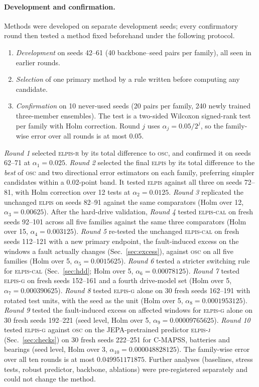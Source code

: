 \documentclass{esannV2}
\newcommand{\OSC}{\textsc{osc}}
\newcommand{\RPT}{\textsc{elpis}}
\newcommand{\Rone}{\textsc{elpis-r}}
\newcommand{\AUTO}{\textsc{elpis-cal}}
\newcommand{\AUTOD}{\textsc{elpis-g}}
\newcommand{\EJ}{\textsc{elpis-j}}
\begin{document}
\paragraph{Development and confirmation.} Methods were developed on separate development seeds; every confirmatory round then tested a method fixed beforehand under the following protocol.
\begin{enumerate}
\item \emph{Development} on seeds 42--61 (40 backbone--seed pairs per family), all seen in earlier rounds.
\item \emph{Selection} of one primary method by a rule written before computing any candidate.
\item \emph{Confirmation} on 10 never-used seeds (20 pairs per family, 240 newly trained three-member ensembles). The test is a two-sided Wilcoxon signed-rank test per family with Holm correction. Round $j$ uses $\alpha_j=0.05/2^j$, so the family-wise error over all rounds is at most 0.05.
\end{enumerate}
\emph{Round 1} selected \Rone{} by its total difference to \OSC, and confirmed it on seeds 62--71 at $\alpha_1=0.025$. \emph{Round 2} selected the final \RPT{} by its total difference to the \emph{best} of \OSC{} and two directional error estimators on each family, preferring simpler candidates within a 0.02-point band. It tested \RPT{} against all three on seeds 72--81, with Holm correction over 12 tests at $\alpha_2=0.0125$. \emph{Round 3} replicated the unchanged \RPT{} on seeds 82--91 against the same comparators (Holm over 12, $\alpha_3=0.00625$). After the hard-drive validation, \emph{Round 4} tested \AUTO{} on fresh seeds 92--101 across all five families against the same three comparators (Holm over 15, $\alpha_4=0.003125$). \emph{Round 5} re-tested the unchanged \AUTO{} on fresh seeds 112--121 with a new primary endpoint, the fault-induced excess on the windows a fault actually changes (Sec.~\ref{sec:excess}), against \OSC{} on all five families (Holm over 5, $\alpha_5=0.0015625$). \emph{Round 6} tested a stricter switching rule for \AUTO{} (Sec.~\ref{sec:hdd}; Holm over 5, $\alpha_6=0.00078125$). \emph{Round 7} tested \AUTOD{} on fresh seeds 152--161 and a fourth drive-model set (Holm over 5, $\alpha_7=0.000390625$). \emph{Round 8} tested \AUTOD{} alone on 30 fresh seeds 162--191 with rotated test units, with the seed as the unit (Holm over 5, $\alpha_8=0.0001953125$). \emph{Round 9} tested the fault-induced excess on affected windows for \AUTOD{} alone on 30 fresh seeds 192--221 (seed level, Holm over 5, $\alpha_9=0.00009765625$). \emph{Round 10} tested \AUTOD{} against \OSC{} on the JEPA-pretrained predictor \EJ{} (Sec.~\ref{sec:checks}) on 30 fresh seeds 222--251 for C-MAPSS, batteries and bearings (seed level, Holm over 3, $\alpha_{10}=0.000048828125$). The family-wise error over all ten rounds is at most $0.049951171875$. Further analyses (baselines, stress tests, robust predictor, backbone, ablations) were pre-registered separately and could not change the method.
\end{document}

